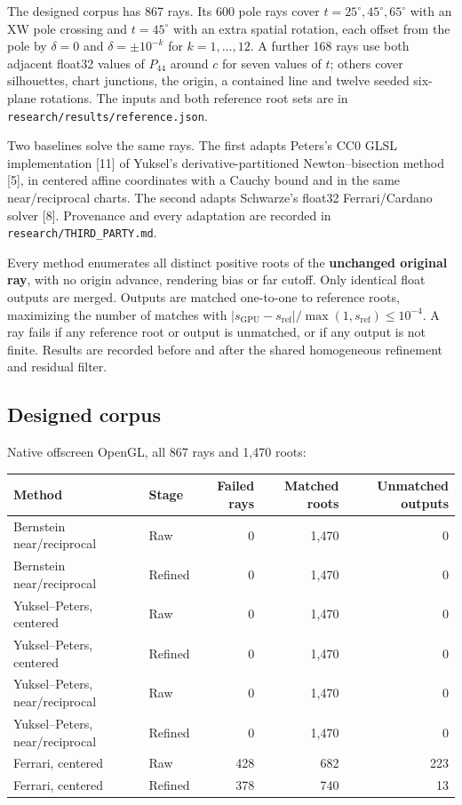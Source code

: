 \documentclass[11pt,a4paper]{article}
\begin{document}
The designed corpus has 867 rays. Its 600 pole rays cover
\(t=25^\circ,45^\circ,65^\circ\) with an XW pole crossing and
\(t=45^\circ\) with an extra spatial rotation, each offset from the pole
by \(\delta=0\) and \(\delta=\pm10^{-k}\) for \(k=1,\ldots,12\). A
further 168 rays use both adjacent float32 values of \(P_{44}\) around
\(c\) for seven values of \(t\); others cover silhouettes, chart
junctions, the origin, a contained line and twelve seeded six-plane
rotations. The inputs and both reference root sets are in
\texttt{research/results/reference.json}.

Two baselines solve the same rays. The first adapts Peters's CC0 GLSL
implementation {[}11{]} of Yuksel's derivative-partitioned
Newton--bisection method {[}5{]}, in centered affine coordinates with a
Cauchy bound and in the same near/reciprocal charts. The second adapts
Schwarze's float32 Ferrari/Cardano solver {[}8{]}. Provenance and every
adaptation are recorded in \texttt{research/THIRD\_PARTY.md}.

Every method enumerates all distinct positive roots of the
\textbf{unchanged original ray}, with no origin advance, rendering bias
or far cutoff. Only identical float outputs are merged. Outputs are
matched one-to-one to reference roots, maximizing the number of matches
with
\(|s_{\mathrm{GPU}}-s_{\mathrm{ref}}|/\max(1,s_{\mathrm{ref}})\leq10^{-4}\).
A ray fails if any reference root or output is unmatched, or if any
output is not finite. Results are recorded before and after the shared
homogeneous refinement and residual filter.

\subsection{Designed corpus}\label{designed-corpus}

Native offscreen OpenGL, all 867 rays and 1,470 roots:

{
\begin{longtable}[]{@{}llrrr@{}}
\toprule\noalign{}
Method & Stage & Failed rays & Matched roots & Unmatched outputs \\
\midrule\noalign{}
\endhead
\bottomrule\noalign{}
\endlastfoot
Bernstein near/reciprocal & Raw & 0 & 1,470 & 0 \\
Bernstein near/reciprocal & Refined & 0 & 1,470 & 0 \\
Yuksel--Peters, centered & Raw & 0 & 1,470 & 0 \\
Yuksel--Peters, centered & Refined & 0 & 1,470 & 0 \\
Yuksel--Peters, near/reciprocal & Raw & 0 & 1,470 & 0 \\
Yuksel--Peters, near/reciprocal & Refined & 0 & 1,470 & 0 \\
Ferrari, centered & Raw & 428 & 682 & 223 \\
Ferrari, centered & Refined & 378 & 740 & 13 \\
\end{longtable}
}
\end{document}
